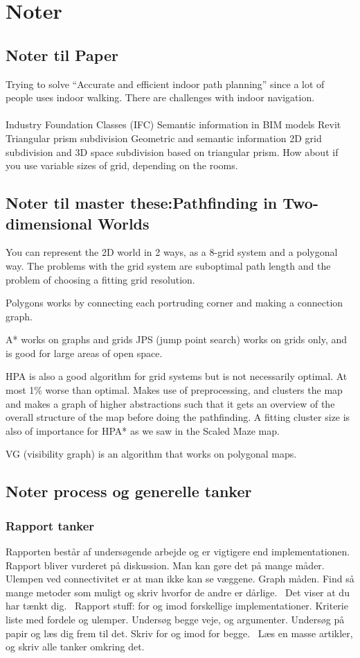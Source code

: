 \section{Noter}
\subsection{Noter til Paper}
Trying to solve “Accurate and efficient indoor path planning” since a lot of people uses indoor walking. There are challenges with indoor navigation.
\\\\
Industry Foundation Classes (IFC)
Semantic information in BIM models
Revit
Triangular prism subdivision
Geometric and semantic information
2D grid subdivision and 3D space subdivision based on triangular prism.
How about if you use variable sizes of grid, depending on the rooms.


\subsection{Noter til master these:Pathfinding in Two-dimensional
Worlds }

You can represent the 2D world in 2 ways, as a 8-grid system and a polygonal way. The problems with the grid system are suboptimal path length and the problem of choosing a fitting grid resolution.

Polygons works by connecting each portruding corner and making a connection graph.

A* works on graphs and grids
JPS (jump point search) works on grids only, and is good for large areas of open space.

HPA is also a good algorithm for grid systems but is not necessarily optimal. At most 1\% worse than optimal. Makes use of preprocessing, and clusters the map and makes a graph of higher abstractions such that it gets an overview of the overall structure of the map before doing the pathfinding.
A fitting cluster size is also of importance for HPA* as we saw in the Scaled Maze map.

VG (visibility graph)
is an algorithm that works on polygonal maps.



\subsection{Noter process og generelle tanker}
\subsubsection{Rapport tanker}
Rapporten består af undersøgende arbejde og er vigtigere end implementationen.
Rapport bliver vurderet på diskussion.
Man kan gøre det på mange måder.
Ulempen ved connectivitet er at man ikke kan se væggene. Graph måden.
Find så mange metoder som muligt og skriv hvorfor de andre er dårlige. 
Det viser at du har tænkt dig. 
Rapport stuff: for og imod forskellige implementationer.
Kriterie liste med fordele og ulemper.
Undersøg begge veje, og argumenter.
Undersøg på papir og læs dig frem til det. Skriv for og imod for begge. 
Læs en masse artikler, og skriv alle tanker omkring det.

